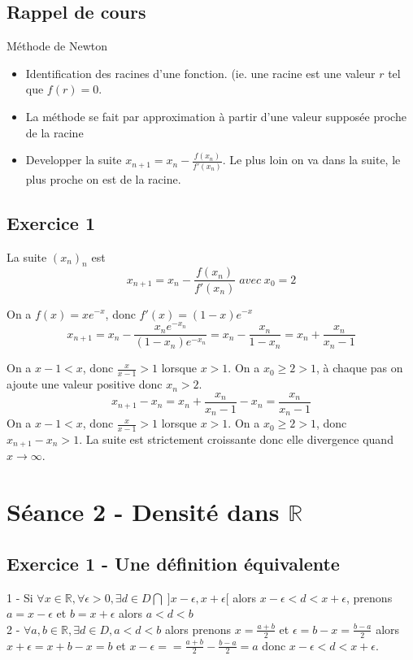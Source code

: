 \documentclass[]{book}
\theoremstyle{definition}
\newcommand{\bb}[1]{\mathbb{#1}}
\newcommand{\R}{\bb{R}}
\begin{document}
\subsection*{Rappel de cours}

M\'ethode de Newton

\begin{itemize}
\item Identification des racines d'une fonction. (ie. une racine est une valeur $r$ tel que $f(r)=0$.
\item La m\'ethode se fait par approximation \`a partir d'une valeur suppos\'ee proche de la racine
\item Developper la suite $x_{n+1} = x_n - \frac{f(x_n)}{f'(x_n)}$. Le plus loin on va dans la suite, le plus proche on est de la racine.
\end{itemize}


\subsection*{Exercice 1}

La suite $(x_n)_n$ est 
$$x_{n+1} = x_n - \frac{f(x_n)}{f'(x_n)}\; avec\; x_0 = 2$$

On a $f(x) = xe^{-x}$, donc $f'(x) = (1-x)e^{-x}$
$$x_{n+1} = x_n - \frac{x_ne^{-x_n}}{(1-x_n)e^{-x_n}} = x_n - \frac{x_n}{1-x_n} = x_n + \frac{x_n}{x_n-1}$$

On a $x-1 < x$, donc $\frac{x}{x-1} > 1$ lorsque $x > 1$. On a $x_0 \geq 2 > 1$, \`a chaque pas on ajoute une valeur positive donc $x_n>2$.\\

$$x_{n+1} - x_{n} = x_n + \frac{x_n}{x_n-1} - x_n = \frac{x_n}{x_n-1}$$
On a $x-1 < x$, donc $\frac{x}{x-1} > 1$ lorsque $x > 1$. On a $x_0 \geq 2 > 1$, donc $x_{n+1} - x_{n} > 1$. La suite est strictement croissante donc elle divergence quand $x \to \infty$.

\newpage
\section*{S\'eance 2 - Densit\'e dans $\R$}

\subsection*{Exercice 1 -  Une d\'efinition \'equivalente}

1 - Si $\forall x \in \R, \forall \epsilon > 0, \exists d \in D \bigcap\; ]x-\epsilon,x+\epsilon[$ alors $x-\epsilon < d < x+\epsilon$, prenons $a=x-\epsilon$ et $b=x+\epsilon$ alors $a<d<b$\\
2 - $\forall a,b \in \R, \exists d \in D, a < d < b$ alors prenons $x=\frac{a+b}{2}$ et $\epsilon = b-x = \frac{b-a}{2}$ alors $x+\epsilon = x + b-x = b$ et $x-\epsilon = = \frac{a+b}{2} - \frac{b-a}{2} = a$ donc $x-\epsilon < d < x+\epsilon$.
\end{document}
